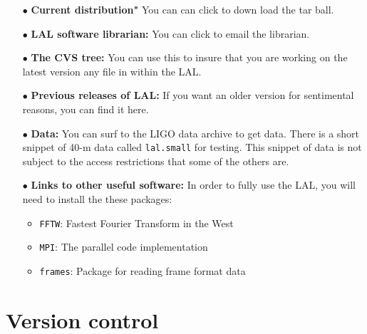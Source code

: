 \documentclass[oneside]{book}
\begin{document}
\begin{itemize}
   \vspace*{-0.1in}
    \item[$\bullet$ ]  {\bf Current distribution"} You can can click
                       to down load the tar ball.
    \vspace*{-0.051in}
    \item[$\bullet$ ] {\bf LAL software librarian:}  You can click to
                      email the librarian.
    \vspace*{-0.051in}
    \item[$\bullet$ ] {\bf The CVS tree:}  You can use this to insure 
                      that you are working on the latest version
                      any file in within the LAL.
    \vspace*{-0.051in}
    \item[$\bullet$]  {\bf Previous releases of LAL:} If you want an older 
                      version for sentimental reasons, you can find it here.
    \vspace*{-0.051in}
    \item[$\bullet$ ] {\bf Data:}  You can surf to the LIGO data archive to get
                      data.  There is a short snippet of 40-m data called 
                      {\tt lal.small} for testing.  This snippet of data 
                      is not subject to the access restrictions that some 
                      of the others are.
    \vspace*{-0.051in}
    \item[$\bullet$ ] {\bf Links to other useful software:} In order to
                      fully use the LAL, you will need to install the
                      these packages:
    \begin{itemize} 
          \vspace*{-0.051in}
          \item {\texttt {FFTW}}:  Fastest Fourier Transform in the West
          \vspace*{-0.051in}
          \item {\texttt {MPI}}:  The parallel code implementation
          \vspace*{-0.051in}
          \item {\texttt {frames}}: Package for reading frame format data
    \end{itemize} 
\end{itemize}

\section{Version control}
\end{document}
